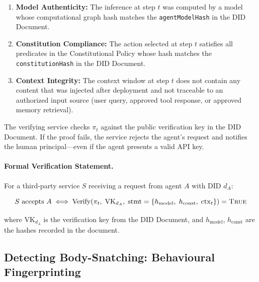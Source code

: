 \begin{enumerate}
  \item \textbf{Model Authenticity:}
    The inference at step $t$ was computed by a model whose
    computational graph hash matches the
    \texttt{agentModelHash} in the DID Document.

  \item \textbf{Constitution Compliance:}
    The action selected at step $t$ satisfies all predicates
    in the Constitutional Policy whose hash matches the
    \texttt{constitutionHash} in the DID Document.

  \item \textbf{Context Integrity:}
    The context window at step $t$ does not contain any
    content that was injected after deployment and not
    traceable to an authorized input source (user query,
    approved tool response, or approved memory retrieval).
\end{enumerate}

The verifying service checks $\pi_t$ against the public
verification key in the DID Document.
If the proof fails, the service rejects the agent's request
and notifies the human principal---even if the agent presents
a valid API key.

\paragraph{Formal Verification Statement.}
For a third-party service $S$ receiving a request from
agent $A$ with DID $d_A$:

\begin{equation}
  \label{eq:did-zk-verify}
  S \text{ accepts } A \iff
  \mathrm{Verify}\!\left(
    \pi_t,\;
    \mathrm{VK}_{d_A},\;
    \mathrm{stmt} = \left\{
      h_{\mathrm{model}},\;
      h_{\mathrm{const}},\;
      \mathrm{ctx}_t
    \right\}
  \right) = \textsc{True}
\end{equation}

where $\mathrm{VK}_{d_A}$ is the verification key from the
DID Document, and $h_{\mathrm{model}}$, $h_{\mathrm{const}}$
are the hashes recorded in the document.

\subsection{Detecting Body-Snatching: Behavioural Fingerprinting}
\label{subsec:body-snatching-detection}

